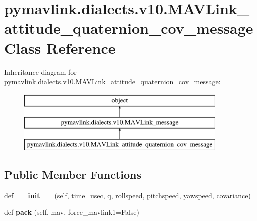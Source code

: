 \hypertarget{classpymavlink_1_1dialects_1_1v10_1_1MAVLink__attitude__quaternion__cov__message}{}\section{pymavlink.\+dialects.\+v10.\+M\+A\+V\+Link\+\_\+attitude\+\_\+quaternion\+\_\+cov\+\_\+message Class Reference}
\label{classpymavlink_1_1dialects_1_1v10_1_1MAVLink__attitude__quaternion__cov__message}
Inheritance diagram for pymavlink.\+dialects.\+v10.\+M\+A\+V\+Link\+\_\+attitude\+\_\+quaternion\+\_\+cov\+\_\+message\+:\begin{figure}[H]
\begin{center}
\leavevmode
\includegraphics[height=3.000000cm]{classpymavlink_1_1dialects_1_1v10_1_1MAVLink__attitude__quaternion__cov__message}
\end{center}
\end{figure}
\subsection*{Public Member Functions}
\begin{DoxyCompactItemize}
\item 
\mbox{\label{classpymavlink_1_1dialects_1_1v10_1_1MAVLink__attitude__quaternion__cov__message_a3a97212c48941595814c2e0debccf12b}} 
def {\bfseries \+\_\+\+\_\+init\+\_\+\+\_\+} (self, time\+\_\+usec, q, rollspeed, pitchspeed, yawspeed, covariance)
\item 
\mbox{\label{classpymavlink_1_1dialects_1_1v10_1_1MAVLink__attitude__quaternion__cov__message_a9aebdf0315582a96ca2ebe1926835701}} 
def {\bfseries pack} (self, mav, force\+\_\+mavlink1=False)
\end{DoxyCompactItemize}
